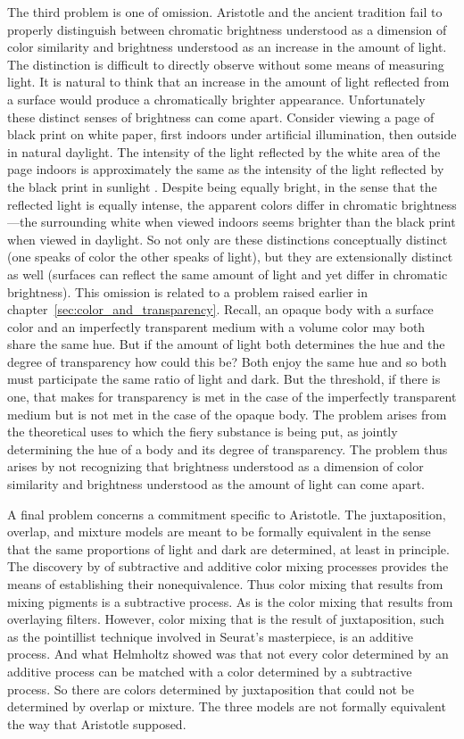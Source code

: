 The third problem is one of omission. Aristotle and the ancient tradition fail to properly distinguish between chromatic brightness understood as a dimension of color similarity and brightness understood as an increase in the amount of light. The distinction is difficult to directly observe without some means of measuring light. It is natural to think that an increase in the amount of light reflected from a surface would produce a chromatically brighter appearance. Unfortunately these distinct senses of brightness can come apart. Consider viewing a page of black print on white paper, first indoors under artificial illumination, then outside in natural daylight. The intensity of the light reflected by the white area of the page indoors is approximately the same as the intensity of the light reflected by the black print in sunlight \citep[199]{Peter-K:1996th}. Despite being equally bright, in the sense that the reflected light is equally intense, the apparent colors differ in chromatic brightness---the surrounding white when viewed indoors seems brighter than the black print when viewed in daylight. So not only are these distinctions conceptually distinct (one speaks of color the other speaks of light), but they are extensionally distinct as well (surfaces can reflect the same amount of light and yet differ in chromatic brightness). This omission is related to a problem raised earlier in chapter~\ref{sec:color_and_transparency}. Recall, an opaque body with a surface color and an imperfectly transparent medium with a volume color may both share the same hue. But if the amount of light both determines the hue and the degree of transparency how could this be? Both enjoy the same hue and so both must participate the same ratio of light and dark. But the threshold, if there is one, that makes for transparency is met in the case of the imperfectly transparent medium but is not met in the case of the opaque body. The problem arises from the theoretical uses to which the fiery substance is being put, as jointly determining the hue of a body and its degree of transparency. The problem thus arises by not recognizing that brightness understood as a dimension of color similarity and brightness understood as the amount of light can come apart.

A final problem concerns a commitment specific to Aristotle. The juxtaposition, overlap, and mixture models are meant to be formally equivalent in the sense that the same proportions of light and dark are determined, at least in principle. The discovery by \citet{Helmholtz:1852aa} of subtractive and additive color mixing processes provides the means of establishing their nonequivalence. Thus color mixing that results from mixing pigments is a subtractive process. As is the color mixing that results from overlaying filters. However, color mixing that is the result of juxtaposition, such as the pointillist technique involved in Seurat's masterpiece, is an additive process. And what Helmholtz showed was that not every color determined by an additive process can be matched with a color determined by a subtractive process. So there are colors determined by juxtaposition that could not be determined by overlap or mixture. The three models are not formally equivalent the way that Aristotle supposed.

